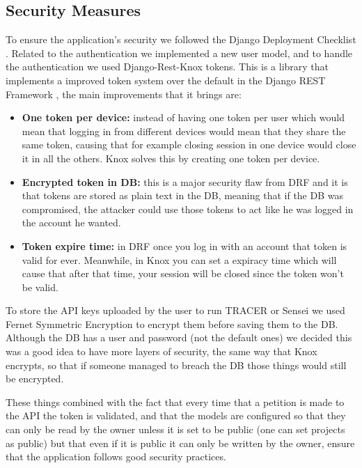 \subsection{Security Measures}

To ensure the application's security we followed the Django Deployment Checklist \autocite{DeploymentChecklistDjango}.
Related to the authentication we implemented a new user model,
and to handle the authentication we used Django-Rest-Knox \autocite{DjangoRestKnox} tokens.
This is a library that implements a improved token system over the default in the Django REST Framework \autocite{DjangoRESTFramework},
the main improvements that it brings are:
\begin{itemize}
  \item \textbf{One token per device:}
    instead of having one token per user
    which would mean that logging in from different devices
    would mean that they share the same token,
    causing that for example closing session in one device would close it in all the others.
    Knox solves this by creating one token per device.

  \item \textbf{Encrypted token in \ac{DB}:}
    this is a major security flaw from \ac{DRF}
    and it is that tokens are stored as plain text in the \ac{DB},
    meaning that if the \ac{DB} was compromised,
    the attacker could use those tokens to act like he was logged in the account he wanted.

  \item \textbf{Token expire time:}
    in \ac{DRF} once you log in with an account that token is valid for ever.
    Meanwhile, in Knox you can set a expiracy time which will cause that after that time,
    your session will be closed since the token won't be valid.
\end{itemize}

To store the \ac{API} keys uploaded by the user to run \ac{TRACER} or Sensei
we used Fernet Symmetric Encryption \autocite{FernetSymmetricEncryption}
to encrypt them before saving them to the \ac{DB}.
Although the \ac{DB} has a user and password (not the default ones)
we decided this was a good idea to have more layers of security,
the same way that Knox encrypts, so that if someone managed to breach the \ac{DB}
those things would still be encrypted.

These things combined with the fact that
every time that a petition is made to the \ac{API} the token is validated,
and that the models are configured so that they can only be
read by the owner unless it is set to be public (one can set projects as public)
but that even if it is public it can only be written by the owner,
ensure that the application follows good security practices.

